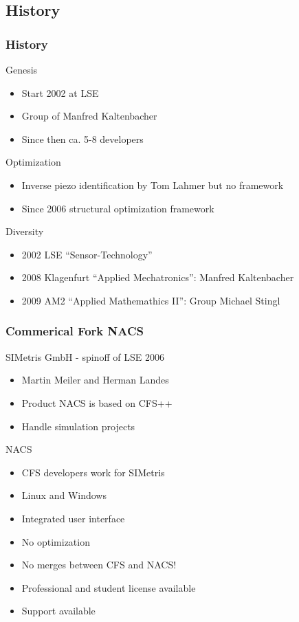 \documentclass{beamer}
\begin{document}
\subsection{History}
\begin{frame}
\frametitle{History}

Genesis
\begin{itemize}
  \item Start 2002 at LSE
  \item Group of Manfred Kaltenbacher
  \item Since then ca. 5-8 developers 
\end{itemize}

Optimization
\begin{itemize}
  \item Inverse piezo identification by Tom Lahmer but no framework
  \item Since 2006 structural optimization framework

\end{itemize}

Diversity
\begin{itemize}
  \item 2002 LSE ``Sensor-Technology''
  \item 2008 Klagenfurt ``Applied Mechatronics'': Manfred Kaltenbacher
  \item 2009 AM2 ``Applied Mathemathics II'': Group Michael Stingl 
\end{itemize}
\end{frame}

\begin{frame}
\frametitle{Commerical Fork NACS}

SIMetris GmbH - spinoff of LSE 2006
\begin{itemize}
 \item Martin Meiler and Herman Landes
 \item Product NACS is based on CFS++
 \item Handle simulation projects
\end{itemize}

NACS
\begin{itemize}
  \item CFS developers work for SIMetris
  \item Linux and Windows
  \item Integrated user interface
  \item No optimization
  \item No merges between CFS and NACS!
  \item Professional and student license available
  \item Support available
\end{itemize}

\end{frame}
\end{document}
